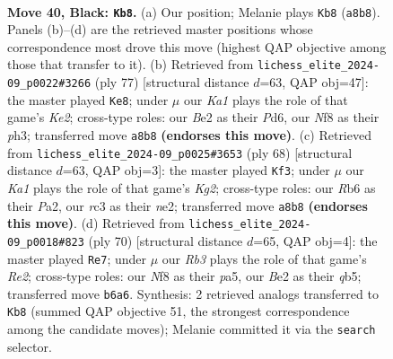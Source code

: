 \documentclass[11pt]{article}
\begin{document}
\clearpage

\begin{figure}[p]\centering
\begin{subfigure}{0.46\textwidth}\centering
\resizebox{\linewidth}{!}{%
\newchessgame
\chessboard[
  setfen={k3rn2/1p6/1r1p4/R5Q1/4Pp2/1PR5/K3b1PP/8 b - - 1 40},
  showmover=false,
  pgfstyle=straightmove, color=movearrow, markmove={a8-b8}
]}
\caption{}
\end{subfigure}\hfill
\begin{subfigure}{0.46\textwidth}\centering
\resizebox{\linewidth}{!}{%
\newchessgame
\chessboard[
  setfen={8/2p1k1Rp/p2pr3/5R2/2P2P2/4PK1P/r7/8 b - - 2 39},
  showmover=false,
  pgfstyle=straightmove, color=movearrow, markmove={e7-e8}
]}
\caption{}
\end{subfigure}
\\[4pt]
\begin{subfigure}{0.46\textwidth}\centering
\resizebox{\linewidth}{!}{%
\newchessgame
\chessboard[
  setfen={r3k3/p4RRp/4pp2/7r/2P2P2/8/P3nPKP/8 w - - 6 35},
  showmover=false,
  pgfstyle=straightmove, color=movearrow, markmove={g2-f3}
]}
\caption{}
\end{subfigure}\hfill
\begin{subfigure}{0.46\textwidth}\centering
\resizebox{\linewidth}{!}{%
\newchessgame
\chessboard[
  setfen={5r1k/8/2p3Q1/pqPp4/6P1/P2r4/1P2R2P/4R1K1 w - - 5 36},
  showmover=false,
  pgfstyle=straightmove, color=movearrow, markmove={e2-e7}
]}
\caption{}
\end{subfigure}
\caption{\textbf{Move 40, Black: \texttt{Kb8}.} (a) Our position; Melanie plays \texttt{Kb8} (\texttt{a8b8}). Panels (b)--(d) are the retrieved master positions whose correspondence most drove this move (highest QAP objective among those that transfer to it). (b) Retrieved from \texttt{lichess\_elite\_2024-09\_p0022\#3266} (ply 77) [structural distance $d$=63, QAP obj=47]: the master played \texttt{Ke8}; under $\mu$ our \emph{Ka1} plays the role of that game's \emph{Ke2}; cross-type roles: our \emph{B}e2 as their \emph{P}d6, our \emph{N}f8 as their \emph{p}h3; transferred move \texttt{a8b8} \textbf{(endorses this move)}. (c) Retrieved from \texttt{lichess\_elite\_2024-09\_p0025\#3653} (ply 68) [structural distance $d$=63, QAP obj=3]: the master played \texttt{Kf3}; under $\mu$ our \emph{Ka1} plays the role of that game's \emph{Kg2}; cross-type roles: our \emph{R}b6 as their \emph{P}a2, our \emph{r}c3 as their \emph{n}e2; transferred move \texttt{a8b8} \textbf{(endorses this move)}. (d) Retrieved from \texttt{lichess\_elite\_2024-09\_p0018\#823} (ply 70) [structural distance $d$=65, QAP obj=4]: the master played \texttt{Re7}; under $\mu$ our \emph{Rb3} plays the role of that game's \emph{Re2}; cross-type roles: our \emph{N}f8 as their \emph{p}a5, our \emph{B}e2 as their \emph{q}b5; transferred move \texttt{b6a6}. Synthesis: 2 retrieved analogs transferred to \texttt{Kb8} (summed QAP objective 51, the strongest correspondence among the candidate moves); Melanie committed it via the \texttt{search} selector.}
\label{fig:thought-m79}
\end{figure}
\end{document}
